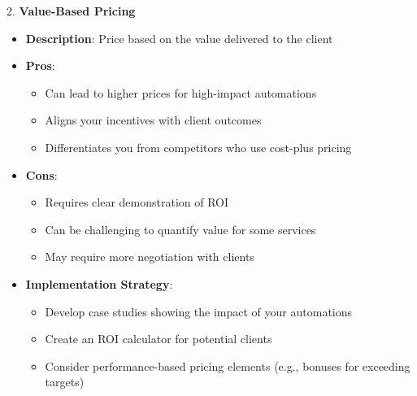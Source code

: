 2. \textbf{Value-Based Pricing}
   \begin{itemize}
     \item \textbf{Description}: Price based on the value delivered to the client
     \item \textbf{Pros}:
       \begin{itemize}
         \item Can lead to higher prices for high-impact automations
         \item Aligns your incentives with client outcomes
         \item Differentiates you from competitors who use cost-plus pricing
       \end{itemize}
     \item \textbf{Cons}:
       \begin{itemize}
         \item Requires clear demonstration of ROI
         \item Can be challenging to quantify value for some services
         \item May require more negotiation with clients
       \end{itemize}
     \item \textbf{Implementation Strategy}:
       \begin{itemize}
         \item Develop case studies showing the impact of your automations
         \item Create an ROI calculator for potential clients
         \item Consider performance-based pricing elements (e.g., bonuses for exceeding targets)
       \end{itemize}
   \end{itemize}

